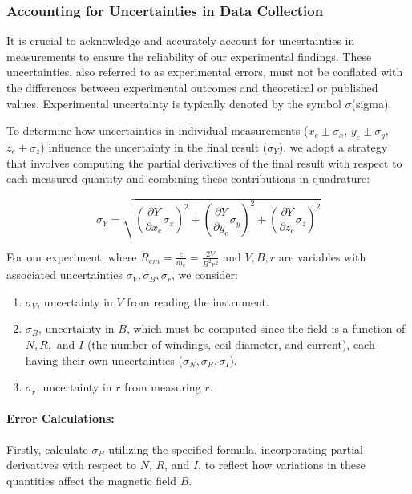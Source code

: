\documentclass{article}
\begin{document}
\subsubsection{Accounting for Uncertainties in Data Collection}
It is crucial to acknowledge and accurately account for uncertainties in measurements to ensure the reliability of our experimental findings. These uncertainties, also referred to as experimental errors, must not be conflated with the differences between experimental outcomes and theoretical or published values. Experimental uncertainty is typically denoted by the symbol \(\sigma\)(sigma).

To determine how uncertainties in individual measurements (\(x_e \pm \sigma_x\), \(y_e \pm \sigma_y\), \(z_e \pm \sigma_z\)) influence the uncertainty in the final result (\(\sigma_Y\)), we adopt a strategy that involves computing the partial derivatives of the final result with respect to each measured quantity and combining these contributions in quadrature:

\[
\sigma_Y = \sqrt{\left(\frac{\partial Y}{\partial x_e} \sigma_x\right)^2 + \left(\frac{\partial Y}{\partial y_e} \sigma_y\right)^2 + \left(\frac{\partial Y}{\partial z_e} \sigma_z\right)^2}
\]

For our experiment, where \(R_{em} = \frac{e}{m_e} = \frac{2V}{B^2 r^2}\) and \(V, B, r\) are variables with associated uncertainties \(\sigma_V, \sigma_B, \sigma_r\), we consider:

\begin{enumerate}
    \item \(\sigma_V\), uncertainty in \(V\) from reading the instrument.
    \item \(\sigma_B\), uncertainty in \(B\), which must be computed since the field is a function of \(N, R,\) and \(I\) (the number of windings, coil diameter, and current), each having their own uncertainties (\(\sigma_N, \sigma_R, \sigma_I\)).
    \item \(\sigma_r\), uncertainty in \(r\) from measuring \(r\).
\end{enumerate}

\paragraph{Error Calculations:}
Firstly, calculate \(\sigma_B\) utilizing the specified formula, incorporating partial derivatives with respect to \(N\), \(R\), and \(I\), to reflect how variations in these quantities affect the magnetic field \(B\).
\end{document}
